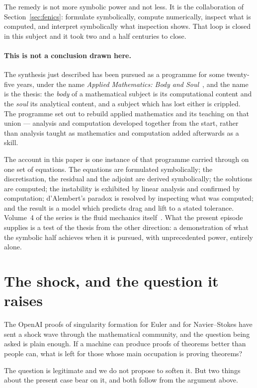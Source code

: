 \documentclass[11pt]{article}
\begin{document}
The remedy is not more symbolic power and not less. It is the collaboration of
Section~\ref{sec:fenics}: formulate symbolically, compute numerically, inspect what is computed, and
interpret symbolically what inspection shows. That loop is closed in this subject and it took two and
a half centuries to close.

\paragraph{This is not a conclusion drawn here.} The synthesis just described has been pursued as a
programme for some twenty-five years, under the name \emph{Applied Mathematics: Body and
Soul}~\cite{bodysoul,bsbooks}, and the name is the thesis: the \emph{body} of a mathematical subject
is its computational content and the \emph{soul} its analytical content, and a subject which has lost
either is crippled. The programme set out to rebuild applied mathematics and its teaching on that
union --- analysis and computation developed together from the start, rather than analysis taught as
mathematics and computation added afterwards as a skill.

The account in this paper is one instance of that programme carried through on one set of equations.
The equations are formulated symbolically; the discretisation, the residual and the adjoint are
derived symbolically; the solutions are computed; the instability is exhibited by linear analysis and
confirmed by computation; d'Alembert's paradox is resolved by inspecting what was computed; and the
result is a model which predicts drag and lift to a stated tolerance. Volume~4 of the series is the
fluid mechanics itself~\cite{book}. What the present episode supplies is a test of the thesis from
the other direction: a demonstration of what the symbolic half achieves when it is pursued, with
unprecedented power, entirely alone.

\section{The shock, and the question it raises}\label{sec:shock}

The OpenAI proofs of singularity formation for Euler and for Navier--Stokes have sent a shock wave
through the mathematical community, and the question being asked is plain enough. If a machine can
produce proofs of theorems better than people can, what is left for those whose main occupation is
proving theorems?

The question is legitimate and we do not propose to soften it. But two things about the present case
bear on it, and both follow from the argument above.
\end{document}
